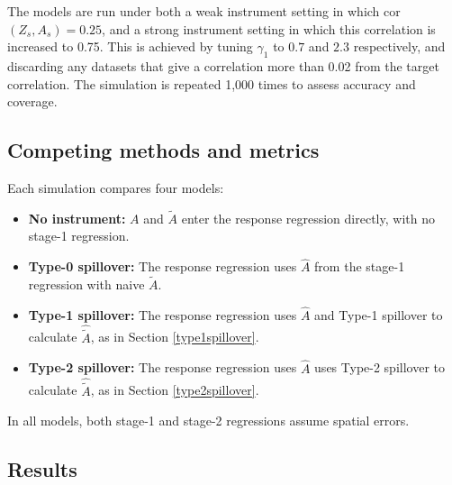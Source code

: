 \documentclass[12pt]{article}
\begin{document}
The models are run under both a weak instrument setting in which cor$(Z_s,A_s) = 0.25$, and a strong instrument setting in which this correlation is increased to 0.75. This is achieved by tuning $\gamma_1$ to $0.7$ and $2.3$ respectively, and discarding any datasets that give a correlation more than 0.02 from the target correlation. The simulation is repeated 1,000 times to assess accuracy and coverage.


\subsection{Competing methods and metrics}\label{s3:sim:methods}

Each simulation compares four models:
\begin{itemize}
    \item \textbf{No instrument:} $A$ and $\tilde{A}$ enter the response regression directly, with no stage-1 regression.
     \item \textbf{Type-0 spillover:} The response regression uses $\hat{A}$ from the stage-1 regression with naive $\tilde{A}$.
    \item \textbf{Type-1 spillover:} The response regression uses $\hat{A}$ and Type-1 spillover to calculate $\hat{\tilde{A}}$, as in Section \ref{type1spillover}.
    \item \textbf{Type-2 spillover:} The response regression uses $\hat{A}$ uses Type-2 spillover to calculate $\hat{\tilde{A}}$, as in Section \ref{type2spillover}.
\end{itemize}
In all models, both stage-1 and stage-2 regressions assume spatial errors.

\subsection{Results}\label{s3:sim:results}
\end{document}
